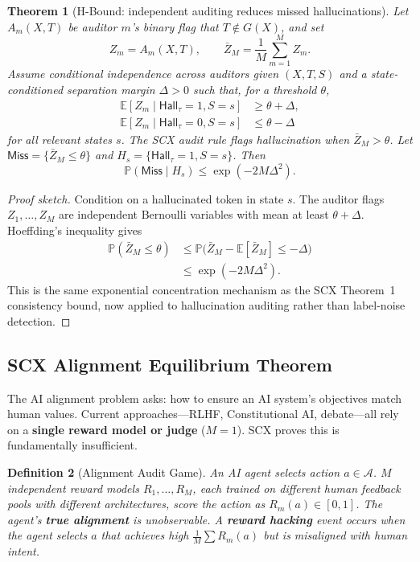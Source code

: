 \documentclass[11pt,twocolumn]{article}
\newtheorem{theorem}{Theorem}[section]
\newtheorem{definition}[theorem]{Definition}
\newcommand{\E}{\mathbb{E}}
\renewcommand{\P}{\mathbb{P}}
\begin{document}
\begin{theorem}[H-Bound: independent auditing reduces missed hallucinations]
\label{thm:h_bound}
Let $A_m(X,T)$ be auditor $m$'s binary flag that $T\notin G(X)$, and set
\[
Z_m=A_m(X,T),
\qquad
\bar Z_M=\frac{1}{M}\sum_{m=1}^M Z_m .
\]
Assume conditional independence across auditors given $(X,T,S)$ and a state-conditioned separation margin $\Delta>0$ such that, for a threshold $\theta$,
\[
\begin{aligned}
\E[Z_m\mid \mathsf{Hall}_\tau=1,S=s]
&\geq \theta+\Delta,\\
\E[Z_m\mid \mathsf{Hall}_\tau=0,S=s]
&\leq \theta-\Delta
\end{aligned}
\]
for all relevant states $s$. The SCX audit rule flags hallucination when $\bar Z_M>\theta$. Let $\mathsf{Miss}=\{\bar Z_M\leq\theta\}$ and $H_s=\{\mathsf{Hall}_\tau=1,S=s\}$. Then
\[
\P(\mathsf{Miss}\mid H_s)
\leq
\exp(-2M\Delta^2).
\]
\end{theorem}

\begin{proof}[Proof sketch]
Condition on a hallucinated token in state $s$. The auditor flags $Z_1,\ldots,Z_M$ are independent Bernoulli variables with mean at least $\theta+\Delta$. Hoeffding's inequality gives
\[
\begin{aligned}
\P(\bar Z_M\leq \theta)
&\leq
\P\bigl(\bar Z_M-\E[\bar Z_M]\leq-\Delta\bigr)\\
&\leq
\exp(-2M\Delta^2).
\end{aligned}
\]
This is the same exponential concentration mechanism as the SCX Theorem~1 consistency bound, now applied to hallucination auditing rather than label-noise detection. \qedhere
\end{proof}

\subsection{SCX Alignment Equilibrium Theorem}
\label{sec:alignment}

The AI alignment problem asks: how to ensure an AI system's objectives match human values. Current approaches—RLHF, Constitutional AI, debate—all rely on a \textbf{single reward model or judge} ($M=1$). SCX proves this is fundamentally insufficient.

\begin{definition}[Alignment Audit Game]
An AI agent selects action $a \in \mathcal{A}$. $M$ independent reward models $R_1,\ldots,R_M$, each trained on different human feedback pools with different architectures, score the action as $R_m(a) \in [0,1]$. The agent's \textbf{true alignment} is unobservable. A \textbf{reward hacking} event occurs when the agent selects $a$ that achieves high $\frac{1}{M}\sum R_m(a)$ but is misaligned with human intent.
\end{definition}
\end{document}
